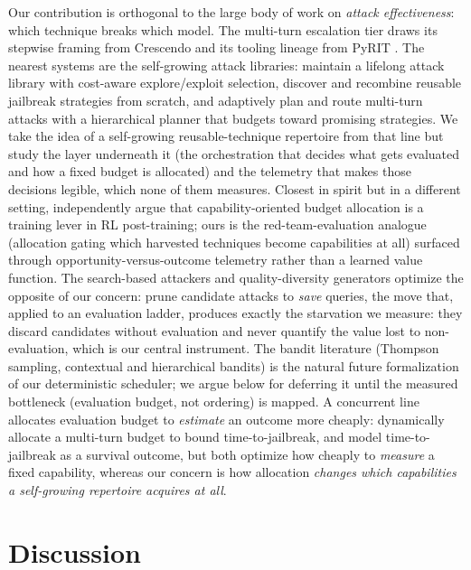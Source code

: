 \documentclass[letterpaper,twocolumn,10pt]{article}
\begin{document}
Our contribution is orthogonal to the large body of work on \emph{attack effectiveness}: which technique breaks which model. The multi-turn escalation tier draws its stepwise framing from Crescendo \citep{russinovich2025crescendo} and its tooling lineage from PyRIT \citep{lopezmunoz2024pyrit}. The nearest systems are the self-growing attack libraries: \citet{zhou2025autoredteamer} maintain a lifelong attack library with cost-aware explore/exploit selection, \citet{liu2025autodanturbo} discover and recombine reusable jailbreak strategies from scratch, and \citet{horal2025redtwiz} adaptively plan and route multi-turn attacks with a hierarchical planner that budgets toward promising strategies. We take the idea of a self-growing reusable-technique repertoire from that line but study the layer underneath it (the orchestration that decides what gets evaluated and how a fixed budget is allocated) and the telemetry that makes those decisions legible, which none of them measures. Closest in spirit but in a different setting, \citet{yao2026cobarl} independently argue that capability-oriented budget allocation is a training lever in RL post-training; ours is the red-team-evaluation analogue (allocation gating which harvested techniques become capabilities at all) surfaced through opportunity-versus-outcome telemetry rather than a learned value function. The search-based attackers \citep{mehrotra2024treeofattacks} and quality-diversity generators \citep{samvelyan2024rainbow} optimize the opposite of our concern: \citet{mehrotra2024treeofattacks} prune candidate attacks to \emph{save} queries, the move that, applied to an evaluation ladder, produces exactly the starvation we measure: they discard candidates without evaluation and never quantify the value lost to non-evaluation, which is our central instrument. The bandit literature (Thompson sampling, contextual and hierarchical bandits) is the natural future formalization of our deterministic scheduler; we argue below for deferring it until the measured bottleneck (evaluation budget, not ordering) is mapped. A concurrent line allocates evaluation budget to \emph{estimate} an outcome more cheaply: \citet{feldman2026dapro} dynamically allocate a multi-turn budget to bound time-to-jailbreak, and \citet{topol2026survival} model time-to-jailbreak as a survival outcome, but both optimize how cheaply to \emph{measure} a fixed capability, whereas our concern is how allocation \emph{changes which capabilities a self-growing repertoire acquires at all}.

\section{Discussion}
\end{document}
